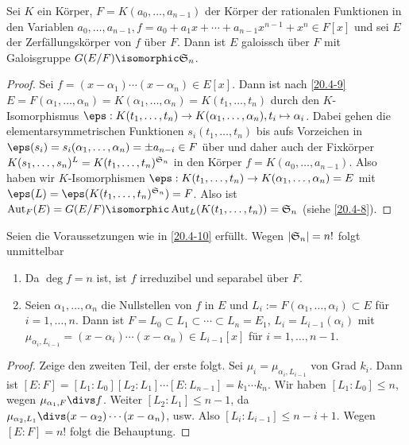 \begin{kor} \label{20.4-10}
	Sei $K$ ein Körper, $F = K(a_0, \dotsc, a_{n-1})$ der Körper der rationalen Funktionen in den Variablen $a_0, \dotsc, a_{n-1}, f = a_0 + a_1 x + \dotsb + a_{n-1} x^{n-1} + x^n \in F[x]$ und sei $E$ der Zerfällungskörper von $f$ über $F$.
	Dann ist $E$ galoissch über $F$ mit Galoisgruppe $G(E / F) \isomorphic \S_n$.
	\begin{proof}
		 Sei $f = (x-\alpha_1) \dotsb (x-\alpha_n) \in E[x]$.
		 Dann ist nach \ref{20.4-9} $E = F(\alpha_1, \dotsc, \alpha_n) = K(\alpha_1, \dotsc, \alpha_n) = K(t_1, \dotsc, t_n)$ durch den $K$-Isomorphismus $\eps: K(t_1, \dotsc, t_n) \to K(\alpha_1, \dotsc, \alpha_n), t_i \mapsto \alpha_i$.
		 Dabei gehen die elementarsymmetrischen Funktionen $s_i(t_1, \dotsc, t_n)$ bis aufs Vorzeichen in $\eps(s_i) = s_i(\alpha_1, \dotsc, \alpha_n) = \pm a_{n-i} \in F$ über und daher auch der Fixkörper $K(s_1, \dotsc, s_n)^L = K(t_1, \dotsc, t_n)^{\S_n}$ in den Körper $f = K(a_0, \dotsc, a_{n-1})$.
		 Also haben wir $K$-Isomorphismen $\eps: K(t_1, \dotsc, t_n) \to K(\alpha_1, \dotsc, \alpha_n) = E$ mit $\eps(L) = \eps(K(t_1, \dotsc, t_n)^{\S_n}) = F$.
		 Also ist $\Aut_F(E) = G(E / F) \isomorphic \Aut_L (K(t_1, \dotsc, t_n)) = \S_n$ (siehe \ref{20.4-8}).
	\end{proof}
\end{kor}

\begin{nt} \label{20.4-11}
	Seien die Voraussetzungen wie in \ref{20.4-10} erfüllt.
	Wegen $|\S_n| = n!$ folgt unmittelbar
	\begin{enumerate}[1.]
		\item
			Da $\deg f = n$ ist, ist $f$ irreduzibel und separabel über $F$.
		\item
			Seien $\alpha_1, \dotsc, \alpha_n$ die Nullstellen von $f$ in $E$ und $L_i := F(\alpha_1, \dotsc, \alpha_i) \subset E$ für $i = 1, \dotsc, n$.
			Dann ist $F = L_0 \subset L_1 \subset \dotsb \subset L_n = E_1$, $L_i = L_{i-1}(\alpha_i)$ mit $\mu_{\alpha_i, L_{i-1}} = (x-\alpha_i)\dotsb (x-\alpha_n) \in L_{i-1}[x]$ für $i = 1, \dotsc, n-1$.
	\end{enumerate}
	\begin{proof}
		Zeige den zweiten Teil, der erste folgt.
		Sei $\mu_i = \mu_{\alpha_i, L_{i-1}}$ von Grad $k_i$.
		Dann ist $[E : F] = [L_1 : L_0 ][L_2 : L_1] \dotsb [E : L_{n-1}] = k_1 \dotsb k_n$.
		Wir haben $[L_1 : L_0] \le n$, wegen $\mu_{\alpha_1, F} \divs f$.
		Weiter $[L_2 : L_1] \le n-1$, da $\mu_{\alpha_2, L_1} \divs (x-\alpha_2) \dotsb (x-\alpha_n)$, usw.
		Also $[L_i : L_{i-1}] \le n - i + 1$.
		Wegen $[E : F] = n!$ folgt die Behauptung.
	\end{proof}
\end{nt}

